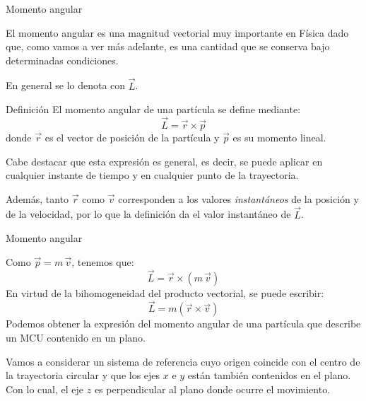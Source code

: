 \documentclass[11pt,handout,aspectratio=1610]{beamer}
\newcommand{\vs}{\vspace{11pt}}
\begin{document}
\begin{frame}{Momento angular}

    El momento angular es una magnitud vectorial muy importante en Física dado que, como vamos a ver más adelante, es una cantidad que se conserva bajo determinadas condiciones.

    \vspace{11pt}

    En general se lo denota con $\vec{L}$.

    \begin{block}{Definición}
        El momento angular de una partícula se define mediante: $$\vec{L} = \vec{r} \times \vec{p}$$ donde $\vec{r}$ es el vector de posición de la partícula y $\vec{p}$ es su momento lineal.
    \end{block}

    Cabe destacar que esta expresión es general, es decir, se puede aplicar en cualquier instante de tiempo y en cualquier punto de la trayectoria.

    \vs

    Además, tanto $\vec{r}$ como $\vec{v}$ corresponden a los valores \emph{instantáneos} de la posición y de la velocidad, por lo que la definición da el valor instantáneo de $\vec{L}$.

\end{frame}

\begin{frame}{Momento angular}

    Como $\vec{p} = m \, \vec{v}$, tenemos que: $$ \vec{L} = \vec{r} \times \left(m \, \vec{v}\right)$$ En virtud de la bihomogeneidad del producto vectorial, se puede escribir: $$\vec{L} = m \left(\vec{r} \times \vec{v}\right)$$ Podemos obtener la expresión del momento angular de una partícula que describe un MCU contenido en un plano.

    \vspace{11pt}

    Vamos a considerar un sistema de referencia cuyo origen coincide con el centro de la trayectoria circular y que los ejes $x$ e $y$ están también contenidos en el plano. Con lo cual, el eje $z$ es perpendicular al plano donde ocurre el movimiento.

\end{frame}
\end{document}
